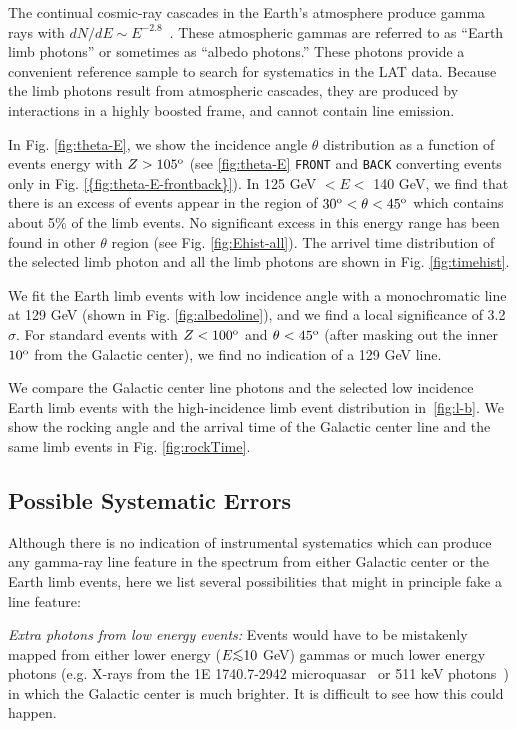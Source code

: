 \documentclass[aps,twocolumn,prd,superscriptaddress,showpacs,nofootinbib,fixfloat]{revtex4}
\newcommand{\degree}{^{\rm o}}
\def\la{\vcenter{\hbox{$<$}\offinterlineskip\hbox{$\sim$}}}
\begin{document}
The continual cosmic-ray cascades in the Earth's atmosphere
produce gamma rays with $dN/dE \sim
E^{-2.8}$~\citep{FermiLimb}. These atmospheric gammas are
referred to as ``Earth limb photons'' or sometimes as
``albedo photons.''  These photons provide a convenient
reference sample to search for systematics in the LAT data.
Because the limb photons result from atmospheric cascades,
they are produced by interactions in a highly boosted frame,
and cannot contain line emission.


In Fig. \ref{fig:theta-E}, we show the incidence angle
$\theta$ distribution as a function of events energy with $Z
> 105\degree$ (see \ref{fig:theta-E} \texttt{FRONT} and
\texttt{BACK} converting events only in
Fig. \ref{{fig:theta-E-frontback}}). In 125 GeV $< E <$ 140
GeV, we find that there is an excess of events appear in the
region of $30\degree < \theta < 45\degree$ which contains
about 5\% of the limb events. No significant excess in this
energy range has been found in other $\theta$ region (see
Fig. \ref{fig:Ehist-all}). The arrivel time distribution of the
selected limb photon and all the limb photons are shown in
Fig. \ref{fig:timehist}.

We fit the Earth limb events with low incidence angle with a
monochromatic line at 129 GeV (shown in Fig.
\ref{fig:albedoline}), and we find a local significance of
3.2$\sigma$. For standard events with $Z<100\degree$ and
$\theta<45\degree$ (after masking out the inner $10\degree$
from the Galactic center), we find no indication of a 129
GeV line.

We compare the Galactic center line photons and the selected
low incidence Earth limb events with the high-incidence limb
event distribution in~\ref{fig:l-b}. We show the rocking
angle and the arrival time of the Galactic center line and
the same limb events in Fig. \ref{fig:rockTime}.


\subsection{Possible Systematic Errors}

Although there is no indication of instrumental systematics
which can produce any gamma-ray line feature in the spectrum
from either Galactic center or the Earth limb events, here
we list several possibilities that might in principle fake a
line feature:

{\it Extra photons from low energy events:} Events would
have to be mistakenly mapped from either lower energy ($E
\la 10$ GeV) gammas or much lower energy photons
(e.g. X-rays from the 1E 1740.7-2942
microquasar~\cite{Gallo:2002} or 511 keV
photons~\cite{Prantzos:2011}) in which the Galactic center
is much brighter.  It is difficult to see how this could
happen.
\end{document}
